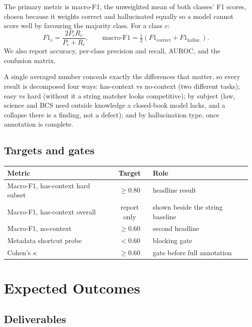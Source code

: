 \documentclass[12pt,a4paper]{article}
\begin{document}
The primary metric is macro-F1, the unweighted mean of both classes' F1
scores, chosen because it weights correct and hallucinated equally so a model
cannot score well by favouring the majority class. For a class $c$:
\[
F1_c = \frac{2 P_c R_c}{P_c + R_c},
\qquad
\text{macro-F1} = \tfrac{1}{2}\left(F1_{\text{correct}} + F1_{\text{halluc.}}\right).
\]
We also report accuracy, per-class precision and recall, AUROC, and the
confusion matrix.

A single averaged number conceals exactly the differences that matter, so every
result is decomposed four ways: has-context vs no-context (two
different tasks); easy vs hard (without it a string matcher looks
competitive); by subject (law, science and BCS need outside knowledge a
closed-book model lacks, and a collapse there is a finding, not a defect); and
by hallucination type, once annotation is complete.

\subsection{Targets and gates}

\begin{center}
\begin{tabular}{L{6.2cm} c L{4.4cm}}
\toprule
\textbf{Metric} & \textbf{Target} & \textbf{Role} \\
\midrule
Macro-F1, has-context hard subset & $\geq 0.80$ & headline result \\
Macro-F1, has-context overall & report only & shown beside the string baseline \\
Macro-F1, no-context & $\geq 0.60$ & second headline \\
Metadata shortcut probe & $< 0.60$ & blocking gate \\
Cohen's $\kappa$ & $\geq 0.60$ & gate before full annotation \\
\bottomrule
\end{tabular}
\end{center}

\section{Expected Outcomes}

\subsection{Deliverables}
\end{document}
